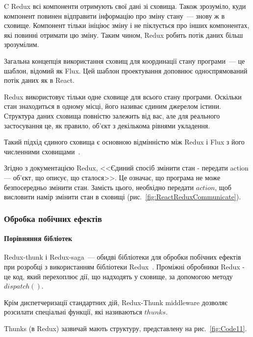 C Redux всі компоненти отримують свої дані зі сховища. Також зрозуміло, куди компонент повинен відправити інформацію про зміну стану~--- знову ж в сховище. Компонент тільки ініціює зміну і не піклується про інших компонентах, які повинні отримати цю зміну. Таким чином, Redux робить потік даних більш зрозумілим.

Загальна концепція використання сховищ для координації стану програми~--- це шаблон, відомий як Flux. Цей шаблон проектування доповнює односпрямований потік даних як в React.

Redux використовує тільки одне сховище для всього стану програми. Оскільки стан знаходиться в одному місці, його називає єдиним джерелом істини. Структура даних сховища повністю залежить від вас, але для реального застосування це, як правило, об'єкт з декількома рівнями укладення.

Такий підхід єдиного сховища є основною відмінністю між Redux і Flux з його численними сховищами~\cite{9781617294976}.

Згідно з документацією Redux, <<Єдиний спосіб змінити стан - передати action — об'єкт, що описує, що сталося>>. Це означає, що програма не може безпосередньо змінити стан. Замість цього, необхідно передати $action$, щоб висловити намір змінити стан в сховищі (рис.~\ref{fig:ReactReduxCommunicate}).

\subsubsection{Обробка побічних ефектів}

\paragraph{Порівняння бібліотек}

Redux-thunk і Redux-saga~--- обидві бібліотеки для обробки побічних ефектів при розробці з використанням бібліотеки Redux~\cite{mezzalira2018mobx}. Проміжні обробники Redux - це код, який перехоплює дії, що надходять у сховище, за допомогою методу $dispatch ()$.


Крім диспетчеризації стандартних дій, Redux-Thunk middleware дозволяє розсилати спеціальні функції, які називаються $thunks$.

Thunks (в Redux) зазвичай мають структуру, представлену на рис.~\ref{fig:Code11}.


